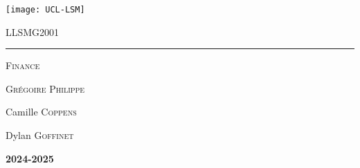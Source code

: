 \documentclass{customSynthesis}
\begin{document}

\begin{titlepage}
	\flushleft\texttt{[image: UCL-LSM]}\\
	\vspace*{2cm}
	\vspace*{\fill}
	\centering
	{\scshape\LARGE LLSMG2001 \par}
	\vspace{0.4cm}
	{\color{clearBlue}\rule{0.7\textwidth}{1pt}\par}
	\vspace{0.5cm}
	{\scshape\Large Finance \par}
	\vspace{0.5cm}
	{\scshape\large Grégoire Philippe\par}
	\vspace{1cm}
	{\scshape\large  \par} %
	{\Large\itshape\par}
	\vspace*{\fill}
	\vfill
	\vfill
	{\Large Camille \textsc{Coppens}\par}
	{\Large Dylan \textsc{Goffinet}\par}
	\vspace{0.5cm}
	{\Large\bfseries 2024-2025\par}
	{\large \par}
\end{titlepage}


\setcounter{tocdepth}{2} %
\tableofcontents
\thispagestyle{empty} %
\clearpage
{}




\end{document}
